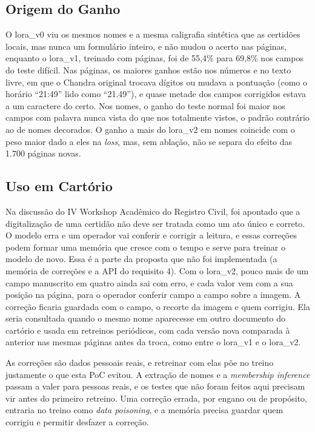 \subsection{Origem do Ganho}

O lora\_v0 viu os mesmos nomes e a mesma caligrafia sintética que as certidões locais, mas nunca um formulário inteiro, e não mudou o acerto nas páginas, enquanto o lora\_v1, treinado com páginas, foi de 55,4\% para 69,8\% nos campos do teste difícil. Nas páginas, os maiores ganhos estão nos números e no texto livre, em que o Chandra original trocava dígitos ou mudava a pontuação (como o horário ``21:49'' lido como ``21.49''), e quase metade dos campos corrigidos estava a um caractere do certo. Nos nomes, o ganho do teste normal foi maior nos campos com palavra nunca vista do que nos totalmente vistos, o padrão contrário ao de nomes decorados. O ganho a mais do lora\_v2 em nomes coincide com o peso maior dado a eles na \emph{loss}, mas, sem ablação, não se separa do efeito das 1.700 páginas novas.

\subsection{Uso em Cartório}
\label{subsec:fluxo}

Na discussão do IV Workshop Acadêmico do Registro Civil, foi apontado que a digitalização de uma certidão não deve ser tratada como um ato único e correto. O modelo erra e um operador vai conferir e corrigir a leitura, e essas correções podem formar uma memória que cresce com o tempo e serve para treinar o modelo de novo. Essa é a parte da proposta que não foi implementada (a memória de correções e a API do requisito 4). Com o lora\_v2, pouco mais de um campo manuscrito em quatro ainda sai com erro, e cada valor vem com a sua posição na página, para o operador conferir campo a campo sobre a imagem. A correção ficaria guardada com o campo, o recorte da imagem e quem corrigiu. Ela seria consultada quando o mesmo nome aparecesse em outro documento do cartório e usada em retreinos periódicos, com cada versão nova comparada à anterior nas mesmas páginas antes da troca, como entre o lora\_v1 e o lora\_v2.

As correções são dados pessoais reais, e retreinar com elas põe no treino justamente o que esta PoC evitou. A extração de nomes e a \emph{membership inference} passam a valer para pessoas reais, e os testes que não foram feitos aqui precisam vir antes do primeiro retreino. Uma correção errada, por engano ou de propósito, entraria no treino como \emph{data poisoning}, e a memória precisa guardar quem corrigiu e permitir desfazer a correção.


